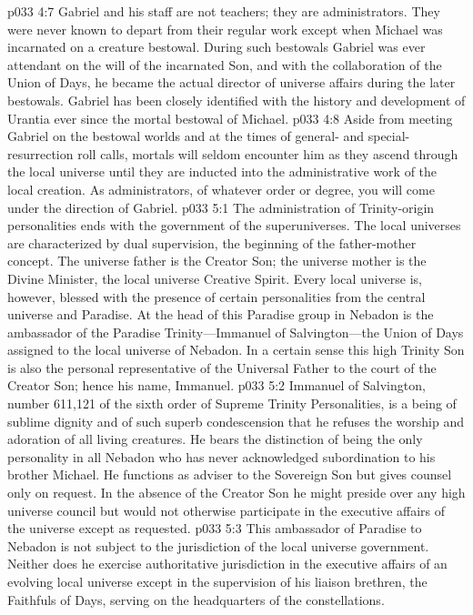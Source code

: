 \pc \vs p033 4:7 Gabriel and his staff are not teachers; they are administrators. They were never known to depart from their regular work except when Michael was incarnated on a creature bestowal. During such bestowals Gabriel was ever attendant on the will of the incarnated Son, and with the collaboration of the Union of Days, he became the actual director of universe affairs during the later bestowals. Gabriel has been closely identified with the history and development of Urantia ever since the mortal bestowal of Michael.
\vs p033 4:8 Aside from meeting Gabriel on the bestowal worlds and at the times of general\hyp{} and special\hyp{}resurrection roll calls, mortals will seldom encounter him as they ascend through the local universe until they are inducted into the administrative work of the local creation. As administrators, of whatever order or degree, you will come under the direction of Gabriel.
\vs p033 5:1 The administration of Trinity\hyp{}origin personalities ends with the government of the superuniverses. The local universes are characterized by dual supervision, the beginning of the father\hyp{}mother concept. The universe father is the Creator Son; the universe mother is the Divine Minister, the local universe Creative Spirit. Every local universe is, however, blessed with the presence of certain personalities from the central universe and Paradise. At the head of this Paradise group in Nebadon is the ambassador of the Paradise Trinity---Immanuel of Salvington---the Union of Days assigned to the local universe of Nebadon. In a certain sense this high Trinity Son is also the personal representative of the Universal Father to the court of the Creator Son; hence his name, Immanuel.\plusone
\vs p033 5:2 Immanuel of Salvington, number 611,121 of the sixth order of Supreme Trinity Personalities, is a being of sublime dignity and of such superb condescension that he refuses the worship and adoration of all living creatures. He bears the distinction of being the only personality in all Nebadon who has never acknowledged subordination to his brother Michael. He functions as adviser to the Sovereign Son but gives counsel only on request. In the absence of the Creator Son he might preside over any high universe council but would not otherwise participate in the executive affairs of the universe except as requested.
\vs p033 5:3 This ambassador of Paradise to Nebadon is not subject to the jurisdiction of the local universe government. Neither does he exercise authoritative jurisdiction in the executive affairs of an evolving local universe except in the supervision of his liaison brethren, the Faithfuls of Days, serving on the headquarters of the constellations.
